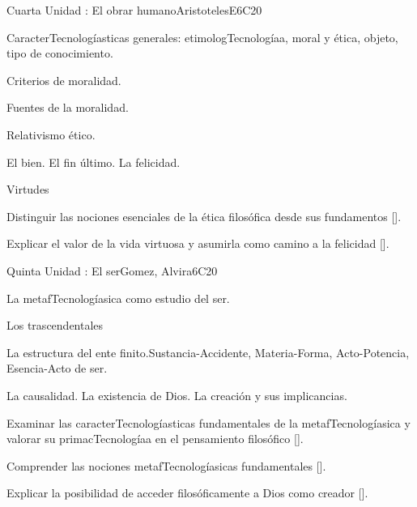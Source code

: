 \begin{syllabus}
\begin{unit}{}{Cuarta Unidad : El obrar humano}{AristotelesE}{6}{C20}
\begin{topics}
	\item CaracterTecnologíasticas generales: etimologTecnologíaa, moral y ética, objeto, tipo de conocimiento.
	\item Criterios de moralidad.
	\item Fuentes de la moralidad.
	\item Relativismo ético.
	\item El bien. El fin último. La felicidad.
	\item Virtudes
\end{topics}
\begin{learningoutcomes}
	\item Distinguir las nociones esenciales de la ética filosófica desde sus fundamentos [\Usage].
    \item Explicar el valor de la vida virtuosa y asumirla como camino a la felicidad [\Usage].
\end{learningoutcomes}
\end{unit}

\begin{unit}{}{Quinta Unidad : El ser}{Gomez, Alvira}{6}{C20}
\begin{topics}
	\item La metafTecnologíasica como estudio del ser.
	\item Los trascendentales
	\item La estructura del ente finito.Sustancia-Accidente, Materia-Forma, Acto-Potencia, Esencia-Acto de ser.
	\item La causalidad. La existencia de Dios. La creación y sus implicancias.
\end{topics}
\begin{learningoutcomes}
	\item Examinar las caracterTecnologíasticas fundamentales de la metafTecnologíasica y valorar su primacTecnologíaa en el pensamiento filosófico [\Usage].
    \item Comprender las nociones metafTecnologíasicas fundamentales [\Usage].
    \item Explicar la posibilidad de acceder filosóficamente a Dios como creador [\Usage].
\end{learningoutcomes}
\end{unit}



\begin{coursebibliography}
\end{coursebibliography}

\end{syllabus}
